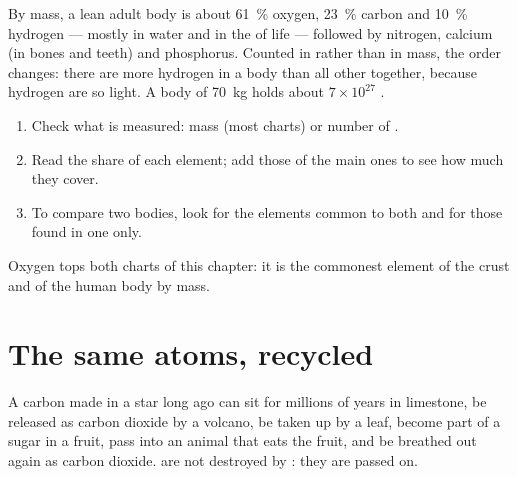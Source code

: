 \begin{proposition}\label{prop:g9:elements-universe-earth:body}
By mass, a lean adult body is about \qty{61}{\percent} oxygen,
\qty{23}{\percent} carbon and \qty{10}{\percent} hydrogen --- mostly in
water and in the  of life --- followed by nitrogen, calcium (in
bones and teeth) and phosphorus. Counted in  rather than in mass,
the order changes: there are more hydrogen  in a body than all
other  together, because hydrogen  are so light. A body of
\qty{70}{kg} holds about $7 \times 10^{27}$ .
\end{proposition}

\begin{method}\label{met:g9:elements-universe-earth:read}
\begin{enumerate}
  \item Check what is measured: mass (most charts) or number of .
  \item Read the share of each element; add those of the main ones to
        see how much they cover.
  \item To compare two bodies, look for the elements common to both and
        for those found in one only.
\end{enumerate}
Oxygen tops both charts of this chapter: it is the commonest element of
the crust and of the human body by mass.
\end{method}

\section{The same atoms, recycled}

\begin{example}\label{ex:g9:elements-universe-earth:journey}
A carbon  made in a star long ago can sit for millions of years in
limestone, be released as carbon dioxide by a volcano, be taken up by a
leaf, become part of a sugar in a fruit, pass into an animal that eats
the fruit, and be breathed out again as carbon dioxide.  are not
destroyed by : they are passed on.
\end{example}

